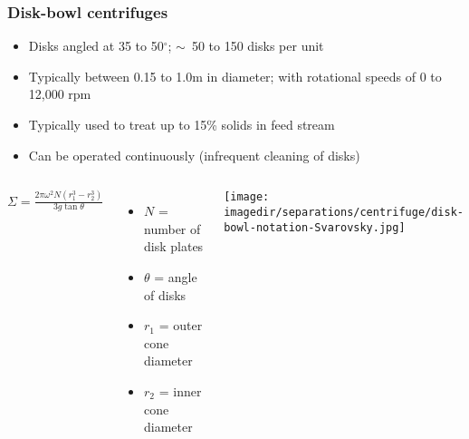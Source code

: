 \begin{frame}\frametitle{Disk-bowl centrifuges}
	\begin{itemize}
		\item	Disks angled at 35 to 50$^\circ$; $\sim$~50 to 150 disks per unit
		\item	Typically between 0.15 to 1.0m in diameter; with rotational speeds of 0 to 12,000 rpm
		\item	Typically used to treat up to 15\% solids in feed stream
		\item	Can be operated continuously (infrequent cleaning of disks)
	\end{itemize}
	\vspace{-12pt}
	\begin{columns}[c]
			$\Sigma = \displaystyle \frac{2\pi\omega^2 N(r_1^3 - r_2^3)}{3g \tan \theta}$
			\vspace{24pt}
			\begin{itemize}
				\item	$N$ = number of disk plates
				\item	$\theta$ = angle of disks
				\item	$r_1$ = outer cone diameter
				\item	$r_2$ = inner cone diameter
			\end{itemize}
			\begin{center}
				\texttt{[image: \\imagedir/separations/centrifuge/disk-bowl-notation-Svarovsky.jpg]}
			\end{center}
	\end{columns}
\end{frame}

